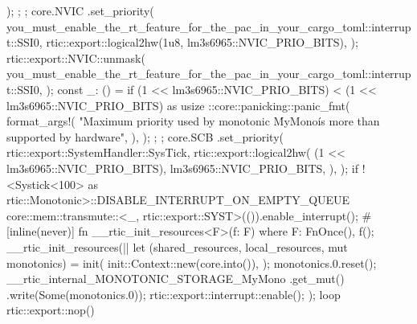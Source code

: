 {{{{{                    );
                };
            };
            core.NVIC
                .set_priority(
                    you_must_enable_the_rt_feature_for_the_pac_in_your_cargo_toml::interrupt::SSI0,
                    rtic::export::logical2hw(1u8, lm3s6965::NVIC_PRIO_BITS),
                );
            rtic::export::NVIC::unmask(
                you_must_enable_the_rt_feature_for_the_pac_in_your_cargo_toml::interrupt::SSI0,
            );
            const _: () = if (1 << lm3s6965::NVIC_PRIO_BITS)
                < (1 << lm3s6965::NVIC_PRIO_BITS) as usize
            {
                {
                    ::core::panicking::panic_fmt(
                        format_args!(
                            "Maximum priority used by monotonic \'MyMono\' is more than supported by hardware",
                        ),
                    );
                };
            };
            core.SCB
                .set_priority(
                    rtic::export::SystemHandler::SysTick,
                    rtic::export::logical2hw(
                        (1 << lm3s6965::NVIC_PRIO_BITS),
                        lm3s6965::NVIC_PRIO_BITS,
                    ),
                );
            if !<Systick<100> as rtic::Monotonic>::DISABLE_INTERRUPT_ON_EMPTY_QUEUE {
                core::mem::transmute::<_, rtic::export::SYST>(()).enable_interrupt();
            }
            #[inline(never)]
            fn __rtic_init_resources<F>(f: F)
            where
                F: FnOnce(),
            {
                f();
            }
            __rtic_init_resources(|| {
                let (shared_resources, local_resources, mut monotonics) = init(
                    init::Context::new(core.into()),
                );
                monotonics.0.reset();
                __rtic_internal_MONOTONIC_STORAGE_MyMono
                    .get_mut()
                    .write(Some(monotonics.0));
                rtic::export::interrupt::enable();
            });
            loop {
                rtic::export::nop()
            }
        }
    }
}
